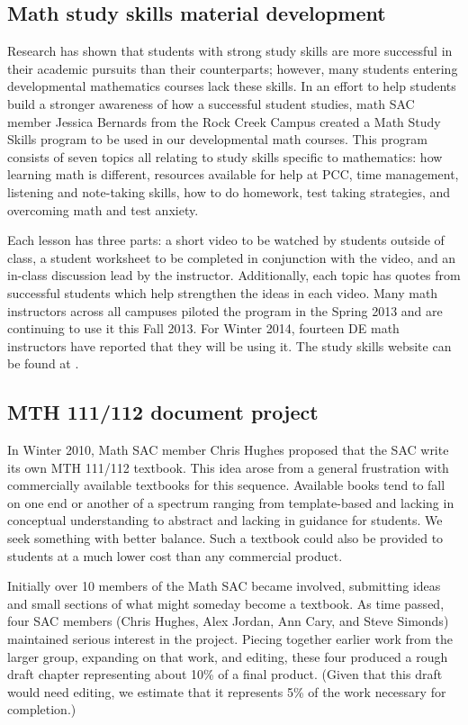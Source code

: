 \subsection{Math study skills material development}\label{cur:sub:studyskills}
Research has shown that students with strong study skills are more successful in
their academic pursuits than their counterparts; however, many
students entering developmental mathematics courses lack these skills.
In an effort to help students build a stronger awareness of how a successful
student studies, math SAC member Jessica Bernards from the Rock Creek Campus
created a Math Study Skills program to be used in our developmental math
courses.  This program consists of seven topics all relating to study skills
specific to mathematics: how learning math is different, resources available for
help at PCC, time management, listening and note-taking skills, how to do
homework, test taking strategies, and overcoming math and test anxiety.  

Each lesson has three parts: a short video to be watched by students
outside of class, a student worksheet to be completed in conjunction with the
video, and an in-class discussion lead by the instructor. Additionally, each
topic has quotes from successful students which help strengthen the ideas in
each video.  Many math instructors across all campuses piloted the program in
the Spring 2013 and are continuing to use it this Fall 2013. For Winter 2014,
fourteen DE math instructors have reported that they will be using it. The study
skills website can be found at \cite{studyskills}.
 
\subsection{MTH 111/112 document project}\label{cur:sec:111/112doc}
In Winter 2010, Math SAC member Chris Hughes proposed that the SAC write its own
MTH 111/112 textbook. This idea arose from a general frustration with
commercially available textbooks for this sequence.  Available books tend to
fall on one end or another of a spectrum ranging from template-based and lacking
in conceptual understanding to abstract and lacking in guidance for students.
We seek something with better balance.  Such a 
textbook could also be provided to students at a much lower cost than any commercial 
product.

Initially over 10 members of the Math SAC became involved, submitting ideas and
small sections of what might someday become a textbook.  As time passed, four
SAC members (Chris Hughes, Alex Jordan, Ann Cary, and Steve Simonds) maintained
serious interest in the project.  Piecing together earlier work from the larger
group, expanding on that work, and editing, these four produced a rough draft
chapter representing about 10\% of a final product. (Given that this draft would
need editing, we estimate that it represents 5\% of the work necessary for
completion.)

